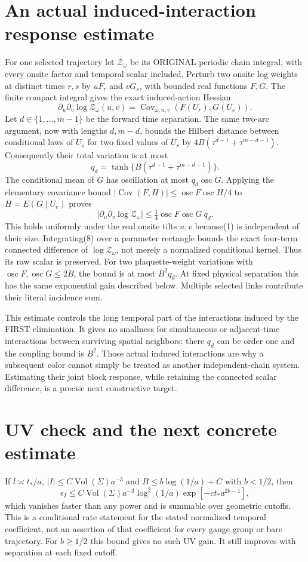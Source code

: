 \documentclass{article}
\begin{document}
\section*{An actual induced-interaction response estimate}
For one selected trajectory let $\mathcal Z_\omega$ be its ORIGINAL periodic chain integral, with every onsite factor and temporal scalar included. Perturb two onsite log weights at distinct times $r,s$ by $uF_r$ and $vG_s$, with bounded real functions $F,G$. The finite compact integral gives the exact induced-action Hessian
\[
 \partial_u\partial_v\log\mathcal Z_\omega(u,v)
 =\operatorname{Cov}_{\omega,u,v}(F(U_r),G(U_s)).       \tag{7}
\]
Let $d\in\{1,\ldots,m-1\}$ be the forward time separation. The same two-arc argument, now with lengths $d,m-d$, bounds the Hilbert distance between conditional laws of $U_s$ for two fixed values of $U_r$ by $4B(\tau^{d-1}+\tau^{m-d-1})$. Consequently their total variation is at most
\[
 q_d=\tanh\{B(\tau^{d-1}+\tau^{m-d-1})\}.
\]
The conditional mean of $G$ has oscillation at most $q_d\operatorname{osc}G$. Applying the elementary covariance bound $|\operatorname{Cov}(F,H)|\le\operatorname{osc}F\operatorname{osc}H/4$ to $H=E(G\mid U_r)$ proves
\[
 |\partial_u\partial_v\log\mathcal Z_\omega|
 \le\tfrac14\operatorname{osc}F\operatorname{osc}G\ q_d.\tag{8}
\]
This holds uniformly under the real onsite tilts $u,v$ because(1) is independent of their size. Integrating(8) over a parameter rectangle bounds the exact four-term connected difference of $\log\mathcal Z_\omega$, not merely a normalized conditional kernel. Thus its raw scalar is preserved. For two plaquette-weight variations with $\operatorname{osc}F,\operatorname{osc}G\le2B$, the bound is at most $B^2q_d$. At fixed physical separation this has the same exponential gain described below. Multiple selected links contribute their literal incidence sum.

This estimate controls the long temporal part of the interactions induced by the FIRST elimination. It gives no smallness for simultaneous or adjacent-time interactions between surviving spatial neighbors: there $q_d$ can be order one and the coupling bound is $B^2$. Those actual induced interactions are why a subsequent color cannot simply be treated as another independent-chain system. Estimating their joint block response, while retaining the connected scalar difference, is a precise next constructive target.

\section*{UV check and the next concrete estimate}
If $l\asymp t_*/a$, $|I|\le C\operatorname{Vol}(\Sigma)a^{-3}$ and $B\le b\log(1/a)+C$ with $b<1/2$, then
\[
 \epsilon_I\le C\operatorname{Vol}(\Sigma)a^{-3}\log^2(1/a)
       \exp[-c t_*a^{2b-1}],                          \tag{6}
\]
which vanishes faster than any power and is summable over geometric cutoffs. This is a conditional rate statement for the stated normalized temporal coefficient, not an assertion of that coefficient for every gauge group or bare trajectory. For $b\ge1/2$ this bound gives no such UV gain. It still improves with separation at each fixed cutoff.
\end{document}
